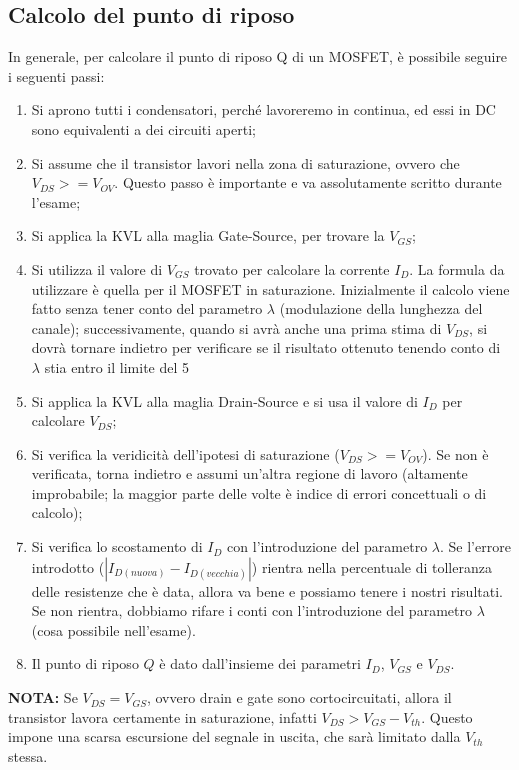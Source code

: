 \documentclass[a4paper,twocolumn,notitlepage]{book}
\begin{document}
	\subsection*{Calcolo del punto di riposo}
	In generale, per calcolare il punto di riposo Q di un MOSFET, è possibile seguire i seguenti passi:
	\begin{enumerate}
		\item
		Si aprono tutti i condensatori, perché lavoreremo in continua, ed essi in DC sono equivalenti a dei circuiti aperti;
		\item
		Si assume che il transistor lavori nella zona di saturazione, ovvero che $V_{DS} >= V_{OV}$. Questo passo è importante e va assolutamente scritto durante l'esame;
		\item
		Si applica la KVL alla maglia Gate-Source, per trovare la $V_{GS}$;
		\item
		Si utilizza il valore di $V_{GS}$ trovato per calcolare la corrente $I_D$. La formula da utilizzare è quella per il MOSFET in saturazione.\newline
		Inizialmente il calcolo viene fatto senza tener conto del parametro $\lambda$ (modulazione della lunghezza del canale); successivamente, quando si avrà anche una prima stima di $V_{DS}$, si dovrà tornare indietro per verificare se il risultato ottenuto tenendo conto di $\lambda$ stia entro il limite del 5%
		\item
		Si applica la KVL alla maglia Drain-Source e si usa il valore di $I_D$ per calcolare $V_{DS}$;
		\item
		Si verifica la veridicità dell'ipotesi di saturazione ($V_{DS} >= V_{OV}$). Se non è verificata, torna indietro e assumi un'altra regione di lavoro (altamente improbabile; la maggior parte delle volte è indice di errori concettuali o di calcolo);
		\item
		Si verifica lo scostamento di $I_{D}$ con l'introduzione del parametro $\lambda$. Se l'errore introdotto ($|I_{D (nuova)} - I_{D (vecchia)}|$) rientra nella percentuale di tolleranza delle resistenze che è data, allora va bene e possiamo tenere i nostri risultati.\newline
		Se non rientra, dobbiamo rifare i conti con l'introduzione del parametro $\lambda$ (cosa possibile nell'esame).
		\item
		Il punto di riposo $Q$ è dato dall'insieme dei parametri $I_D$, $V_{GS}$ e $V_{DS}$.		
		
	\end{enumerate}\medskip
	\textbf{NOTA:} Se $V_{DS}=V_{GS}$, ovvero drain e gate sono cortocircuitati, allora il transistor lavora certamente in saturazione, infatti $V_{DS} > V_{GS} - V_{th}$. Questo impone una scarsa escursione del segnale in uscita, che sarà limitato dalla $V_{th}$ stessa.
	
\end{document}
